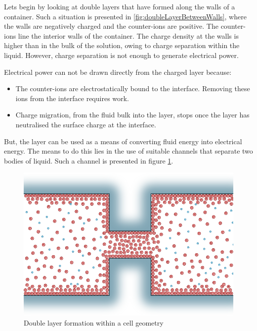     Lets begin by looking at double layers that have formed along the walls of a container.
    Such a situation is presented in \ref{fig:doubleLayerBetweenWalls}, where the walls are negatively charged and the counter-ions are positive.
    The counter-ions line the interior walls of the container.
    The charge density at the walls is higher than in the bulk of the solution, owing to charge separation within the liquid.
    However, charge separation is not enough to generate electrical power.

    Electrical power can not be drawn directly from the charged layer because:
    \begin{itemize}
        \item The counter-ions are electrostatically bound to the interface.
            Removing these ions from the interface requires work.
        \item Charge migration, from the fluid bulk into the layer, stops once the layer has neutralised the surface charge at the interface.
    \end{itemize}
    But, the layer can be used as a means of converting fluid energy into electrical energy.
    The means to do this lies in the use of suitable channels that separate two bodies of liquid.
    Such a channel is presented in figure \ref{fig:doubleLayerInChannel_noPressure}.

    \begin{figure}
        \centering
        \includegraphics{content/pt1/01-PowerHarvesting/graphics/intro_cell_settled}
        \caption{\label{fig:doubleLayerInChannel_noPressure}Double layer formation within a cell geometry}
    \end{figure}

